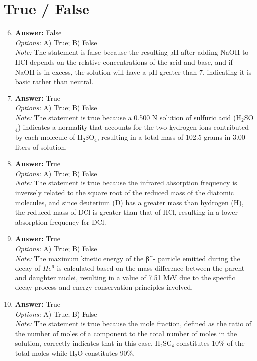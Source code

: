 \documentclass[12pt]{article}
\begin{document}
\section*{True / False}
\begin{enumerate}[label=\arabic*.]
\setcounter{enumi}{5}
\item \textbf{Answer:} False
\\ \textit{Options:} A) True; B) False
\\ \textit{Note:} The statement is false because the resulting pH after adding NaOH to HCl depends on the relative concentrations of the acid and base, and if NaOH is in excess, the solution will have a pH greater than 7, indicating it is basic rather than neutral.
\item \textbf{Answer:} True
\\ \textit{Options:} A) True; B) False
\\ \textit{Note:} The statement is true because a 0.500 N solution of sulfuric acid (H$_{2}$SO$_{4}$) indicates a normality that accounts for the two hydrogen ions contributed by each molecule of H$_{2}$SO$_{4}$, resulting in a total mass of 102.5 grams in 3.00 liters of solution.
\item \textbf{Answer:} True
\\ \textit{Options:} A) True; B) False
\\ \textit{Note:} The statement is true because the infrared absorption frequency is inversely related to the square root of the reduced mass of the diatomic molecules, and since deuterium (D) has a greater mass than hydrogen (H), the reduced mass of DCl is greater than that of HCl, resulting in a lower absorption frequency for DCl.
\item \textbf{Answer:} True
\\ \textit{Options:} A) True; B) False
\\ \textit{Note:} The maximum kinetic energy of the β^- particle emitted during the decay of $He^6$ is calculated based on the mass difference between the parent and daughter nuclei, resulting in a value of 7.51 MeV due to the specific decay process and energy conservation principles involved.
\item \textbf{Answer:} True
\\ \textit{Options:} A) True; B) False
\\ \textit{Note:} The statement is true because the mole fraction, defined as the ratio of the number of moles of a component to the total number of moles in the solution, correctly indicates that in this case, H₂SO₄ constitutes 10\% of the total moles while H₂O constitutes 90\%.
\end{enumerate}
\end{document}
